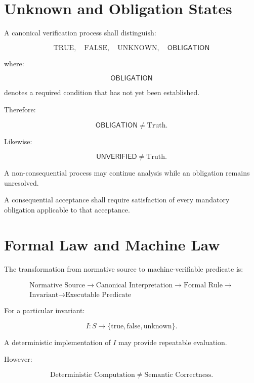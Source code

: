 \documentclass[11pt]{article}
\newcommand{\Unknown}{\mathsf{UNVERIFIED}}
\newcommand{\Obligation}{\mathsf{OBLIGATION}}
\begin{document}
\section{Unknown and Obligation States}

A canonical verification process shall distinguish:

\[
\boxed{
\text{TRUE},
\quad
\text{FALSE},
\quad
\text{UNKNOWN},
\quad
\Obligation
}
\]

where:

\[
\Obligation
\]

denotes a required condition that has not yet been established.

Therefore:

\[
\boxed{
\Obligation\neq\text{Truth}.
}
\]

Likewise:

\[
\boxed{
\Unknown\neq\text{Truth}.
}
\]

A non-consequential process may continue analysis while an
obligation remains unresolved.

A consequential acceptance shall require satisfaction of every
mandatory obligation applicable to that acceptance.

\section{Formal Law and Machine Law}

The transformation from normative source to machine-verifiable
predicate is:

\[
\boxed{
\begin{gathered}
\text{Normative Source}
\rightarrow
\text{Canonical Interpretation}
\rightarrow
\text{Formal Rule}
\rightarrow\\
\text{Invariant}
\rightarrow
\text{Executable Predicate}
\end{gathered}
}
\]

For a particular invariant:

\[
I:S\rightarrow\{\mathrm{true},\mathrm{false},\mathrm{unknown}\}.
\]

A deterministic implementation of $I$ may provide repeatable
evaluation.

However:

\[
\boxed{
\text{Deterministic Computation}
\neq
\text{Semantic Correctness}.
}
\]
\end{document}
